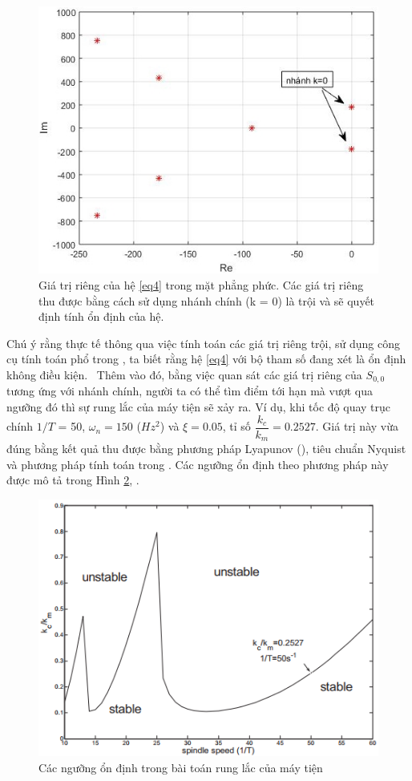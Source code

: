 \begin{figure}[h!]
	\centering
	\includegraphics[width=0.7\linewidth]{hinh/spectrum_chatter-2}
	\caption{Giá trị riêng của hệ \eqref{eq4} trong mặt phẳng phức. Các giá trị riêng thu được bằng cách sử dụng nhánh chính (k = 0) là trội và sẽ quyết định tính ổn định của hệ.}
	\label{spectrumchatter-2}
\end{figure}

Chú ý rằng thực tế thông qua việc tính toán các giá trị riêng trội, sử dụng công cụ tính toán phổ trong \cite{Eng01}, ta biết rằng hệ \eqref{eq4} với bộ tham số đang xét là ổn định không điều kiện. \ 
Thêm vào đó, bằng việc quan sát các giá trị riêng của $S_{0,0}$ tương ứng với nhánh chính, người ta có thể tìm điểm tới hạn mà vượt qua ngưỡng đó thì sự rung lắc của máy tiện sẽ xảy ra. Ví dụ, khi tốc độ quay trục chính $1/T$ = 50, $\omega_n = 150$ ($Hz^2$) và $\xi = 0.05$, tỉ số $\dfrac{k_c}{k_m} = 0.2527$. Giá trị này vừa đúng bằng kết quả thu được bằng phương pháp Lyapunov (\cite{Mal87}), tiêu chuẩn Nyquist và phương pháp tính toán trong \cite{Che98}. Các ngưỡng ổn định theo phương pháp này được mô tả trong Hình \ref{fig:stability-lobes}, \cite[Chương 3]{Yi10}.

\begin{figure}[h!]
	\centering
	\includegraphics[width=0.8\linewidth]{hinh/stability-lobes}
	\caption{Các ngưỡng ổn định trong bài toán rung lắc của máy tiện}
	\label{fig:stability-lobes}
\end{figure}

